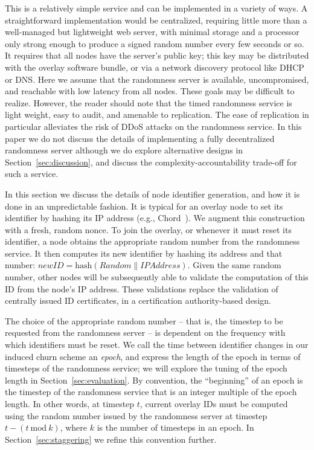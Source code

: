\documentclass[10pt,twocolumn]{article}
\begin{document}
This is a relatively simple service and  can be implemented in
a variety of ways.  A straightforward implementation would be centralized,
requiring little more than a well-managed but lightweight web server, with minimal storage
and a processor only strong enough to produce a signed random number
every few seconds or so.  It requires that all nodes have the
server's public key; this key may be distributed with the overlay software bundle, or 
via a network discovery protocol like DHCP or DNS. Here we assume that the randomness
server is available, uncompromised, and reachable with low latency
from all nodes.  These goals may be difficult to realize.  However, the reader should note
that the timed randomness service is light weight, easy to audit, and amenable to replication.
The ease of replication in particular alleviates the risk of DDoS attacks on the 
randomness service. In this paper we do not discuss the details of implementing a 
fully decentralized randomness server although we do explore alternative designs in
Section~\ref{sec:discussion}, and discuss the complexity-accountability trade-off for such a service.

\label{sec:identifiers}

In this section we discuss the details of node identifier generation, and how it is done
in an unpredictable fashion.  It is typical for an overlay node to set its
identifier by hashing its IP address
(e.g., Chord~\cite{Stoica2003}).   We augment this construction with a
fresh, random nonce. To join the
overlay, or whenever it must reset its identifier, a node obtains the
appropriate random number from the randomness service.  It then computes
its new identifier by hashing its address and that number: $\mathit{newID} =
\mathrm{hash}(\mathit{Random} \| \mathit{IPAddress})$.  Given the
same random number, 
other nodes will be subsequently able to validate the computation of
this ID from the node's IP address.  These validations replace the
validation of centrally issued ID certificates, in a certification
authority-based design.

The choice of the appropriate random number -- that is, the timestep
to be requested from the randomness server -- is dependent on the
frequency with which identifiers must be reset.  We call the time
between identifier changes in our induced churn scheme an
\emph{epoch}, and express the length of the epoch in terms of timesteps
of the randomness service; we will explore the tuning of the
epoch length in Section~\ref{sec:evaluation}.  By convention,
the ``beginning'' of an epoch is the timestep of the randomness
service that is an integer multiple of the epoch length.  In other
words, at timestep $t$, current overlay IDs must be computed
using the random number issued by the randomness server at timestep
$t - (t \mathrm{\ mod\ } k)$, where $k$ is the number of timesteps
in an epoch. In Section~\ref{sec:staggering} we
refine this convention further.
\end{document}
